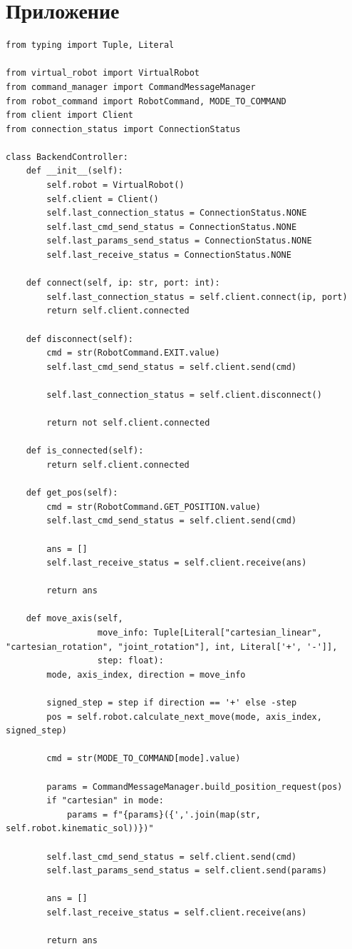 \documentclass[a4paper,14pt]{extarticle}
\begin{document}
\section{Приложение}
\begin{lstlisting}[label=lst:backctrl, caption={Скрипт, объединяющий различные функции для полноценного взаимодействия с роботом с компьютера.}]
from typing import Tuple, Literal

from virtual_robot import VirtualRobot
from command_manager import CommandMessageManager
from robot_command import RobotCommand, MODE_TO_COMMAND
from client import Client
from connection_status import ConnectionStatus

class BackendController:
    def __init__(self):
        self.robot = VirtualRobot()
        self.client = Client()
        self.last_connection_status = ConnectionStatus.NONE
        self.last_cmd_send_status = ConnectionStatus.NONE
        self.last_params_send_status = ConnectionStatus.NONE
        self.last_receive_status = ConnectionStatus.NONE

    def connect(self, ip: str, port: int):
        self.last_connection_status = self.client.connect(ip, port)
        return self.client.connected

    def disconnect(self):
        cmd = str(RobotCommand.EXIT.value)
        self.last_cmd_send_status = self.client.send(cmd)
        
        self.last_connection_status = self.client.disconnect()
        
        return not self.client.connected

    def is_connected(self):
        return self.client.connected

    def get_pos(self):
        cmd = str(RobotCommand.GET_POSITION.value)
        self.last_cmd_send_status = self.client.send(cmd)

        ans = []
        self.last_receive_status = self.client.receive(ans)

        return ans

    def move_axis(self,
                  move_info: Tuple[Literal["cartesian_linear", "cartesian_rotation", "joint_rotation"], int, Literal['+', '-']],
                  step: float):
        mode, axis_index, direction = move_info

        signed_step = step if direction == '+' else -step
        pos = self.robot.calculate_next_move(mode, axis_index, signed_step)

        cmd = str(MODE_TO_COMMAND[mode].value)

        params = CommandMessageManager.build_position_request(pos)
        if "cartesian" in mode:
            params = f"{params}({','.join(map(str, self.robot.kinematic_sol))})"

        self.last_cmd_send_status = self.client.send(cmd)
        self.last_params_send_status = self.client.send(params)

        ans = []
        self.last_receive_status = self.client.receive(ans)

        return ans
\end{lstlisting}
\end{document}
